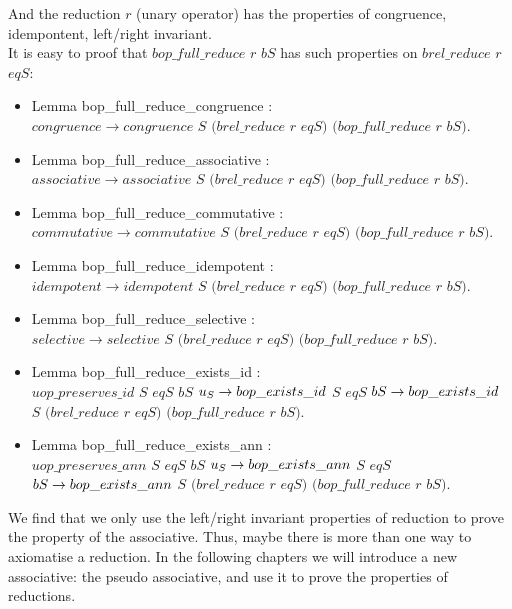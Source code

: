 \documentclass[a4paper,12pt,twoside,openright]{report}
\begin{document}
And the reduction $r$ (unary operator) has the properties of congruence, idempontent, left/right invariant.\\
It is easy to proof that $bop\_full\_reduce$ $r$ $bS$ has such properties on $brel\_reduce$ $r$ $eqS$:
\begin{itemize}
\item Lemma bop\_full\_reduce\_congruence : \\$congruence \rightarrow congruence$ $S$ $(brel\_reduce$ $r$ $eqS)$ $(bop\_full\_reduce$ $r$ $bS).$ 
\item Lemma bop\_full\_reduce\_associative : \\$associative \rightarrow associative$ $S$ $(brel\_reduce$ $r$ $eqS)$ $(bop\_full\_reduce$ $r$ $bS).$ 
\item Lemma bop\_full\_reduce\_commutative : \\$commutative \rightarrow commutative$ $S$ $(brel\_reduce$ $r$ $eqS)$ $(bop\_full\_reduce$ $r$ $bS).$ 
\item Lemma bop\_full\_reduce\_idempotent : \\$idempotent \rightarrow idempotent$ $S$ $(brel\_reduce$ $r$ $eqS)$ $(bop\_full\_reduce$ $r$ $bS).$ 
\item Lemma bop\_full\_reduce\_selective : \\$selective \rightarrow selective$ $S$ $(brel\_reduce$ $r$ $eqS)$ $(bop\_full\_reduce$ $r$ $bS).$  
\item Lemma bop\_full\_reduce\_exists\_id : \\$uop\_preserves\_id$ $S$ $eqS$ $bS$ $u_S \rightarrow\\ bop\_exists\_id$ $S$ $eqS$ $bS \rightarrow\\ bop\_exists\_id$ $S$ $(brel\_reduce$ $r$ $eqS)$ $(bop\_full\_reduce$ $r$ $bS).$ 
\item Lemma bop\_full\_reduce\_exists\_ann : \\$uop\_preserves\_ann$ $S$ $eqS$ $bS$ $u_S \rightarrow\\ bop\_exists\_ann$ $S$ $eqS$ $bS \rightarrow\\ bop\_exists\_ann$ $S$ $(brel\_reduce$ $r$ $eqS)$ $(bop\_full\_reduce$ $r$ $bS).$ 
\end{itemize}
We find that we only use the left/right invariant properties of reduction to prove the property of the associative.
Thus, maybe there is more than one way to axiomatise a reduction. 
In the following chapters we will introduce a new associative: the pseudo associative, and use it to prove the properties of reductions.
\end{document}
